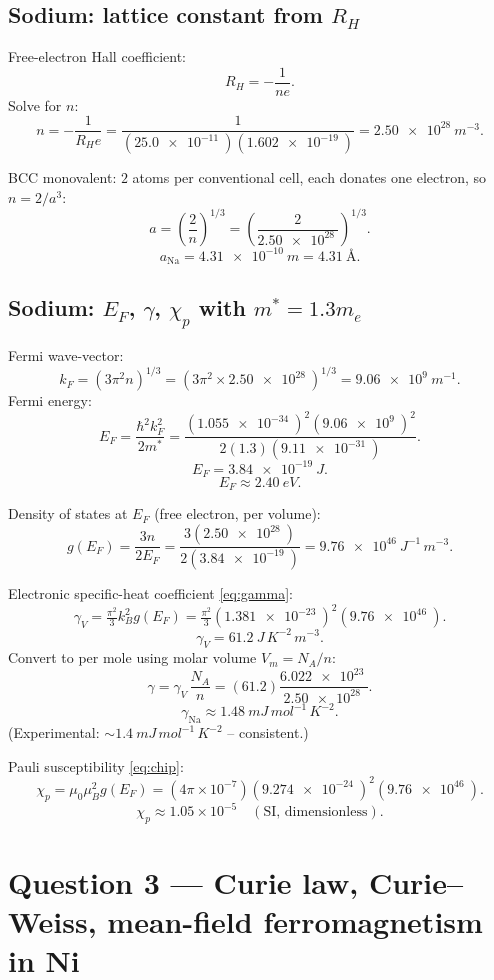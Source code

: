 \documentclass[11pt]{article}
\begin{document}
\subsection*{Sodium: lattice constant from $R_{H}$}

Free-electron Hall coefficient:
\[ R_{H} = -\frac{1}{ne}. \]
Solve for $n$:
\[ n = -\frac{1}{R_{H}e} = \frac{1}{(\SI{25.0e-11}{})(\SI{1.602e-19}{})} = \SI{2.50e28}{m^{-3}}. \]

BCC monovalent: $2$ atoms per conventional cell, each donates one electron, so $n=2/a^{3}$:
\[ a = \left(\frac{2}{n}\right)^{\!1/3} = \left(\frac{2}{\SI{2.50e28}{}}\right)^{\!1/3}. \]
\[ \boxed{\;a_{\text{Na}} = \SI{4.31e-10}{m} = \SI{4.31}{\angstrom}.\;} \]

\subsection*{Sodium: $E_{F}$, $\gamma$, $\chi_{p}$ with $m^{*}=1.3 m_{e}$}

Fermi wave-vector:
\[ k_{F} = (3\pi^{2}n)^{1/3} = (3\pi^{2}\times \SI{2.50e28}{})^{1/3} = \SI{9.06e9}{m^{-1}}. \]
Fermi energy:
\[ E_{F} = \frac{\hbar^{2}k_{F}^{2}}{2m^{*}} = \frac{(\SI{1.055e-34}{})^{2}(\SI{9.06e9}{})^{2}}{2(1.3)(\SI{9.11e-31}{})}. \]
\[ E_{F} = \SI{3.84e-19}{J}. \]
\[ \boxed{\;E_{F}\approx \SI{2.40}{eV}.\;} \]

Density of states at $E_{F}$ (free electron, per volume):
\[ g(E_{F}) = \frac{3n}{2 E_{F}} = \frac{3(\SI{2.50e28}{})}{2(\SI{3.84e-19}{})} = \SI{9.76e46}{J^{-1}\,m^{-3}}. \]

Electronic specific-heat coefficient \eqref{eq:gamma}:
\[ \gamma_{V} = \tfrac{\pi^{2}}{3}k_{B}^{2}g(E_{F}) = \tfrac{\pi^{2}}{3}(\SI{1.381e-23}{})^{2}(\SI{9.76e46}{}). \]
\[ \gamma_{V} = \SI{61.2}{J\,K^{-2}\,m^{-3}}. \]
Convert to per mole using molar volume $V_{m}=N_{A}/n$:
\[ \gamma = \gamma_{V}\,\frac{N_{A}}{n} = (61.2)\frac{\SI{6.022e23}{}}{\SI{2.50e28}{}}. \]
\[ \boxed{\;\gamma_{\text{Na}}\approx \SI{1.48}{mJ\,mol^{-1}\,K^{-2}}.\;} \]
(Experimental: $\sim\SI{1.4}{mJ\,mol^{-1}\,K^{-2}}$ -- consistent.)

Pauli susceptibility \eqref{eq:chip}:
\[ \chi_{p} = \mu_{0}\mu_{B}^{2}g(E_{F}) = (4\pi\times 10^{-7})(\SI{9.274e-24}{})^{2}(\SI{9.76e46}{}). \]
\[ \boxed{\;\chi_{p}\approx 1.05\times 10^{-5}\quad(\text{SI, dimensionless}).\;} \]

\section*{Question 3 --- Curie law, Curie--Weiss, mean-field ferromagnetism in Ni}
\end{document}
